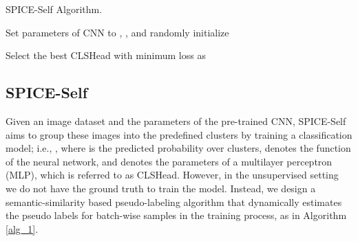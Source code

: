 \documentclass[10pt,twocolumn,letterpaper]{article}
\begin{document}
\begin{algorithm}
\scriptsize
\label{alg_1}
\caption{SPICE-Self Algorithm.}
\LinesNumbered
{}
Set parameters of CNN to , , and randomly initialize  \;

Select the best CLSHead with minimum loss as  \;

\ForEach{}{
         \;
        \;
}
\end{algorithm}


\subsection{SPICE-Self}
\label{sec_proto}
Given an image dataset  and the parameters  of the pre-trained CNN, SPICE-Self aims to group these images into the predefined  clusters by training a classification model; i.e., , where  is the predicted probability over  clusters,  denotes the function of the neural network, and  denotes the parameters of a multilayer perceptron (MLP), which is referred to as CLSHead.
However, in the unsupervised setting we do not have the ground truth to train the model. Instead, we design a semantic-similarity based pseudo-labeling algorithm that dynamically estimates the pseudo labels for batch-wise samples in the training process, as in Algorithm \ref{alg_1}.
\end{document}
